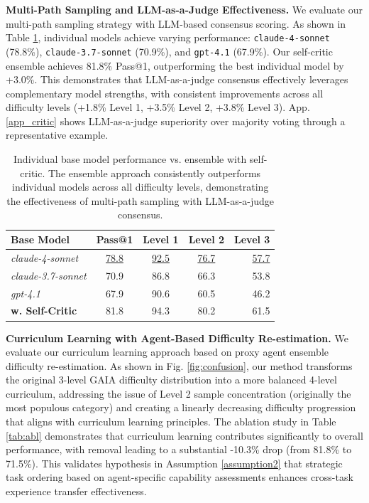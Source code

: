 \documentclass{article} %
\begin{document}
\textbf{Multi-Path Sampling and LLM-as-a-Judge Effectiveness.} We evaluate our multi-path sampling strategy with LLM-based consensus scoring. As shown in Table \ref{tab:cor}, individual models achieve varying performance: \texttt{claude-4-sonnet} (78.8\%), \texttt{claude-3.7-sonnet} (70.9\%), and \texttt{gpt-4.1} (67.9\%). Our self-critic ensemble achieves 81.8\% Pass@1, outperforming the best individual model by +3.0\%. This demonstrates that LLM-as-a-judge consensus effectively leverages complementary model strengths, with consistent improvements across all difficulty levels (+1.8\% Level 1, +3.5\% Level 2, +3.8\% Level 3). App. \ref{app_critic} shows LLM-as-a-judge superiority over majority voting through a representative example.
\begin{table}[!thb]
    \centering
    \caption{Individual base model performance vs. ensemble with self-critic. The ensemble approach consistently outperforms individual models across all difficulty levels, demonstrating the effectiveness of multi-path sampling with LLM-as-a-judge consensus.}
    \vspace{0.8em}
    \label{tab:cor}
    \begin{tabular}{lcccr}
        \toprule
        \midrule
        \textbf{Base Model} & \textbf{Pass@1} & \textbf{Level 1} & \textbf{Level 2} & \textbf{Level 3}\\
        \midrule
        \textit{claude-4-sonnet} & \underline{78.8} & \underline{92.5} & \underline{76.7} & \underline{57.7} \\
        \textit{claude-3.7-sonnet} & 70.9 & 86.8 & 66.3 & 53.8 \\
        \textit{gpt-4.1} & 67.9 & 90.6 & 60.5 & 46.2 \\
        \midrule
        \textbf{w. Self-Critic} & 81.8 & 94.3 & 80.2 & 61.5 \\
        \bottomrule
    \end{tabular}
\end{table}

\textbf{Curriculum Learning with Agent-Based Difficulty Re-estimation.} We evaluate our curriculum learning approach based on proxy agent ensemble difficulty re-estimation. As shown in Fig. \ref{fig:confusion}, our method transforms the original 3-level GAIA difficulty distribution into a more balanced 4-level curriculum, addressing the issue of Level 2 sample concentration (originally the most populous category) and creating a linearly decreasing difficulty progression that aligns with curriculum learning principles. The ablation study in Table \ref{tab:abl} demonstrates that curriculum learning contributes significantly to overall performance, with removal leading to a substantial -10.3\% drop (from 81.8\% to 71.5\%). This validates hypothesis in Assumption \ref{assumption2} that strategic task ordering based on agent-specific capability assessments enhances cross-task experience transfer effectiveness.
\end{document}
